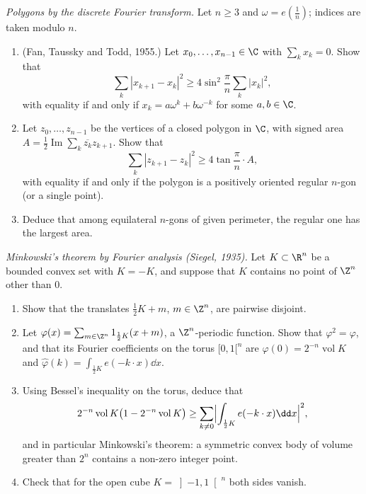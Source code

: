 \begin{exercise}[$\star\star$]\label{pb:fantaussky}
\emph{Polygons by the discrete Fourier transform.} Let $n\ge3$ and $\omega=e(\frac1n)$; indices are taken modulo $n$.
\begin{enumerate}[label=(\alph*)]
\item (Fan, Taussky and Todd, 1955.) Let $x_0,\dots,x_{n-1}\in\C$ with $\sum_kx_k=0$. Show that
\[
\sum_k|x_{k+1}-x_k|^2\ge4\sin^2\frac\pi n\sum_k|x_k|^2,
\]
with equality if and only if $x_k=a\omega^k+b\omega^{-k}$ for some $a,b\in\C$.
\item Let $z_0,\dots,z_{n-1}$ be the vertices of a closed polygon in $\C$, with signed area $A=\frac12\operatorname{Im}\sum_k\overline{z_k}z_{k+1}$. Show that
\[
\sum_k|z_{k+1}-z_k|^2\ge4\tan\frac\pi n\cdot A,
\]
with equality if and only if the polygon is a positively oriented regular $n$-gon (or a single point).
\item Deduce that among equilateral $n$-gons of given perimeter, the regular one has the largest area.
\end{enumerate}
\end{exercise}

\begin{exercise}[$\star\star\star$]\label{pb:siegel}
\emph{Minkowski's theorem by Fourier analysis (Siegel, 1935).} Let $K\subset\R^n$ be a bounded convex set with $K=-K$, and suppose
that $K$ contains no point of $\Z^n$ other than $0$.
\begin{enumerate}[label=(\alph*)]
\item Show that the translates $\frac12K+m$, $m\in\Z^n$, are pairwise disjoint.
\item Let $\varphi(x)=\sum_{m\in\Z^n}1_{\frac12K}(x+m)$, a $\Z^n$-periodic function. Show that $\varphi^2=\varphi$, and that its Fourier coefficients
on the torus $[0,1[^n$ are $\hat\varphi(0)=2^{-n}\operatorname{vol}K$ and $\hat\varphi(k)=\int_{\frac12K}e(-k\cdot x)\dd x$.
\item Using Bessel's inequality on the torus, deduce that
\[
2^{-n}\operatorname{vol}K\bigl(1-2^{-n}\operatorname{vol}K\bigr)\ge\sum_{k\ne0}\Bigl|\int_{\frac12K}e(-k\cdot x)\dd x\Bigr|^2,
\]
and in particular Minkowski's theorem: a symmetric convex body of volume greater than $2^n$ contains a non-zero integer point.
\item Check that for the open cube $K=\left]-1,1\right[^n$ both sides vanish.
\end{enumerate}
\end{exercise}

